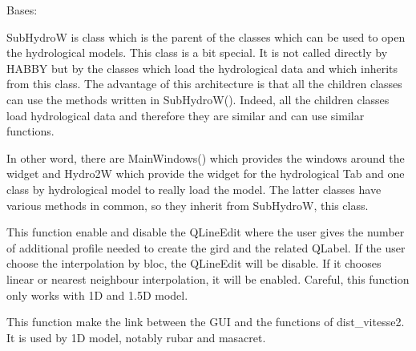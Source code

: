 \documentclass[letterpaper,10pt,english]{sphinxmanual}
\begin{document}
\begin{fulllineitems}
\begin{fulllineitems}
\end{fulllineitems}


\end{fulllineitems}


\begin{fulllineitems}
\label{\detokenize{index:src_GUI.hydro_GUI_2.SubHydroW}}
Bases: 

SubHydroW is class which is the parent of the classes which can be used to open the hydrological models. This class
is a bit special. It is not called directly by HABBY but by the classes which load the hydrological data and which
inherits from this class. The advantage of this architecture is that all the children classes can use the methods
written in SubHydroW(). Indeed, all the children classes load hydrological data and therefore they are similar and can use
similar functions.

In other word, there are MainWindows() which provides the windows around the widget and Hydro2W which provide the widget for the
hydrological Tab and one class by hydrological model to really load the model. The latter classes have various
methods in common, so they inherit from SubHydroW, this class.

\begin{fulllineitems}
\label{\detokenize{index:src_GUI.hydro_GUI_2.SubHydroW.dis_enable_nb_profile}}
This function enable and disable the QLineEdit where the user gives the number of additional profile needed to
create the gird and the related QLabel. If the user choose the interpolation by bloc, the QLineEdit will be
disable. If it chooses linear or nearest neighbour interpolation, it will be enabled. Careful, this function
only works with 1D and 1.5D model.

\end{fulllineitems}


\begin{fulllineitems}
\label{\detokenize{index:src_GUI.hydro_GUI_2.SubHydroW.distribute_velocity}}
This function make the link between the GUI and the functions of dist\_vitesse2. It is used by 1D model,
notably rubar and masacret.


\end{fulllineitems}
\end{fulllineitems}
\end{document}
